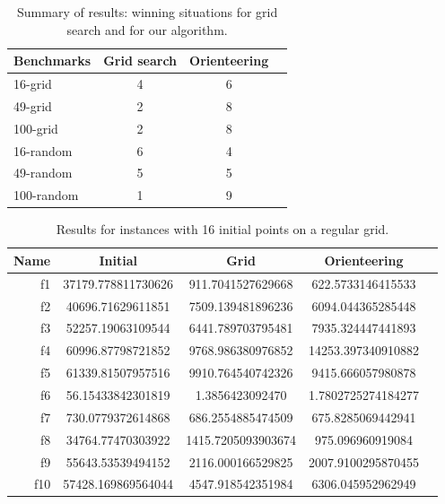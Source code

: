 \documentclass[smallextended]{svjour3}
\begin{document}
\begin{table}[!htbp]
  \centering
  \caption{Summary of results: winning situations for grid search and for our algorithm.}
  \begin{tabular}{lccc}
    Benchmarks & Grid search & Orienteering \\\hline
    16-grid    &      4      &    6      \\
    49-grid    &      2      &    8      \\
    100-grid   &      2      &    8      \\
    16-random  &      6      &    4      \\
    49-random  &      5      &    5      \\
    100-random &      1      &    9      \\
  \end{tabular}
  \label{tab:results}
\end{table}


\begin{table}[!htbp]
  \centering
  \caption{Results for instances with 16 initial points on a regular grid.}
%
\begin{tabular}{r|SSSS}
  \toprule
  {Name} & {Initial} & {Grid} & {Orienteering} \\
  \midrule
  f1  & 37179.778811730626 &    911.7041527629668 & 622.5733146415533   \\ 
  f2  & 40696.71629611851  &   7509.139481896236  & 6094.044365285448   \\ 
  f3  & 52257.19063109544  &   6441.789703795481  & 7935.324447441893   \\ 
  f4  & 60996.87798721852  &   9768.986380976852  & 14253.397340910882  \\ 
  f5  & 61339.81507957516  &   9910.764540742326  & 9415.666057980878   \\ 
  f6  & 56.15433842301819  &      1.3856423092470 & 1.7802725274184277  \\ 
  f7  & 730.0779372614868  &   686.2554885474509  & 675.8285069442941   \\ 
  f8  & 34764.77470303922  &  1415.7205093903674  & 975.096960919084    \\ 
  f9  & 55643.53539494152  &  2116.000166529825   & 2007.9100295870455  \\ 
  f10 & 57428.169869564044 &  4547.918542351984   & 6306.045952962949   \\
  \bottomrule
\end{tabular}
  \label{tab:res16a}
\end{table}
\end{document}
